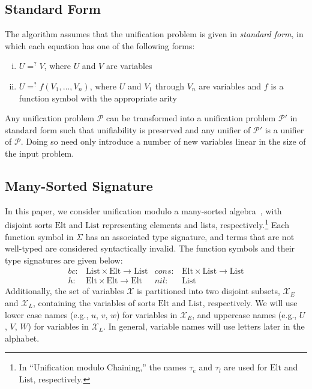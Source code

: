 \documentclass[11pt,twoside,titlepage]{article}
\newcommand{\ueq}{=_{}^?}
\newcommand{\X}{\mathcal{X}}
\newcommand{\p}{\mathcal{P}}
\newcommand{\Elt}{\mathrm{Elt}}
\newcommand{\List}{\mathrm{List}}
\newcommand{\Bc}{\mathit{bc}}
\newcommand{\Hh}{\mathit{h}}
\newcommand{\Cons}{\mathit{cons}}
\newcommand{\Nil}{\mathit{nil}}
\begin{document}
\subsection{Standard Form}\label{subsection:standard-form}

The algorithm assumes that the unification problem is given in \emph{standard
form}, in which each equation has one of the following forms:
\begin{enumerate}[(i)]
    \item $U \ueq V$, where $U$ and $V$ are variables
    \item $U \ueq f(V_1, \dotsc, V_n)$, where $U$ and $V_1$ through $V_n$ are
        variables and $f$ is a function symbol with the appropriate arity
\end{enumerate}
Any unification problem $\p$ can be transformed into a unification problem
$\p'$ in standard form such that unifiability is preserved and any unifier of
$\p'$ is a unifier of $\p$. Doing so need only introduce a number of new variables
linear in the size of the input problem.

\subsection{Many-Sorted Signature}\label{subsection:signature}

In this paper, we consider unification modulo a many-sorted
algebra~\cite{walther1988many, kirchner1988order}, with disjoint sorts $\Elt$
and $\List$ representing elements and lists, respectively.\footnote{In
``Unification modulo Chaining,'' the names $\tau_e$ and $\tau_l$ are used for
$\Elt$ and $\List$, respectively.} Each function symbol in $\Sigma$ has an
associated type signature, and terms that are not well-typed are considered
syntactically invalid. The function symbols and their type signatures are given
below:
\begin{align*}
    \Bc \colon &\List \times \Elt \to \List &
    \Cons \colon &\Elt \times \List \to \List \\
    \Hh \colon &\Elt \times \Elt \to \Elt &
    \Nil \colon &\List
\end{align*}
Additionally, the set of variables $\X$ is partitioned into two disjoint subsets,
$\X_E$ and $\X_L$, containing the variables of sorts $\Elt$ and $\List$, respectively.
We will use lower case names (e.g., $u$, $v$, $w$) for variables in $\X_E$, and
uppercase names (e.g., $U$, $V$, $W$) for variables in $\X_L$. In general, variable
names will use letters later in the alphabet.
\end{document}
